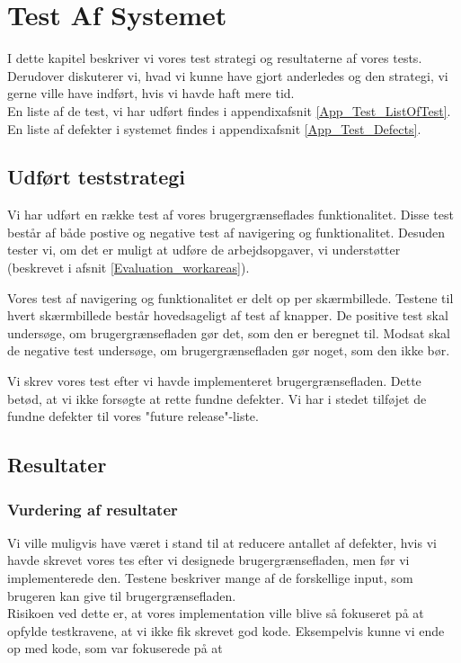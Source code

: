 \chapter{Test Af Systemet}
\label{Test}
I dette kapitel beskriver vi vores test strategi og resultaterne af vores tests. Derudover diskuterer vi, hvad vi kunne have gjort anderledes og den strategi, vi gerne ville have indført, hvis vi havde haft mere tid.
\\En liste af de test, vi har udført findes i appendixafsnit \ref{App_Test_ListOfTest}. En liste af defekter i systemet findes i appendixafsnit \ref{App_Test_Defects}.

\section{Udført teststrategi}
\label{Test_strat}
Vi har udført en række test af vores brugergrænseflades funktionalitet. Disse test består af både postive og negative test af navigering og funktionalitet. Desuden tester vi, om det er muligt at udføre de arbejdsopgaver, vi understøtter (beskrevet i afsnit \ref{Evaluation_workareas}).

Vores test af navigering og funktionalitet er delt op per skærmbillede. Testene til hvert skærmbillede består hovedsageligt af test af knapper. De positive test skal undersøge, om brugergrænsefladen gør det, som den er beregnet til. Modsat skal de negative test undersøge, om brugergrænsefladen gør noget, som den ikke bør.

Vi skrev vores test efter vi havde implementeret brugergrænsefladen. Dette betød, at vi ikke forsøgte at rette fundne defekter. Vi har i stedet  tilføjet de fundne defekter til vores "future release"-liste.

\section{Resultater}
\label{Test_Results}


\subsection{Vurdering af resultater}
\label{Test_Results_eval}

Vi ville muligvis have været i stand til at reducere antallet af defekter, hvis vi havde skrevet vores tes efter vi designede brugergrænsefladen, men før vi implementerede den. Testene beskriver mange af de forskellige input, som brugeren kan give til brugergrænsefladen. 
\\Risikoen ved dette er, at vores implementation ville blive så fokuseret på at opfylde testkravene, at vi ikke fik skrevet god kode. Eksempelvis kunne vi ende op med kode, som var fokuserede på at

